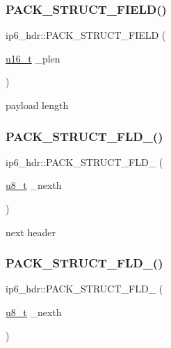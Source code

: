 \subsubsection{\texorpdfstring{P\+A\+C\+K\+\_\+\+S\+T\+R\+U\+C\+T\+\_\+\+F\+I\+E\+L\+D()}{PACK\_STRUCT\_FIELD()}\hspace{0.1cm}{\footnotesize\ttfamily [4/4]}}
{\footnotesize\ttfamily ip6\+\_\+hdr\+::\+P\+A\+C\+K\+\_\+\+S\+T\+R\+U\+C\+T\+\_\+\+F\+I\+E\+LD (\begin{DoxyParamCaption}\item[{\hyperlink{group__compiler__abstraction_ga77570ac4fcab86864fa1916e55676da2}{u16\+\_\+t}}]{\+\_\+plen }\end{DoxyParamCaption})}

payload length \mbox{\label{structip6__hdr_a7e8821e0eb16fe1f048228c119a69942}} 
\subsubsection{\texorpdfstring{P\+A\+C\+K\+\_\+\+S\+T\+R\+U\+C\+T\+\_\+\+F\+L\+D\+\_()}{PACK\_STRUCT\_FLD\_8()}\hspace{0.1cm}{\footnotesize\ttfamily [1/4]}}
{\footnotesize\ttfamily ip6\+\_\+hdr\+::\+P\+A\+C\+K\+\_\+\+S\+T\+R\+U\+C\+T\+\_\+\+F\+L\+D\+\_ (\begin{DoxyParamCaption}\item[{\hyperlink{group__compiler__abstraction_ga4caecabca98b43919dd11be1c0d4cd8e}{u8\+\_\+t}}]{\+\_\+nexth }\end{DoxyParamCaption})}

next header \mbox{\label{structip6__hdr_a7e8821e0eb16fe1f048228c119a69942}} 
\subsubsection{\texorpdfstring{P\+A\+C\+K\+\_\+\+S\+T\+R\+U\+C\+T\+\_\+\+F\+L\+D\+\_()}{PACK\_STRUCT\_FLD\_8()}\hspace{0.1cm}{\footnotesize\ttfamily [2/4]}}
{\footnotesize\ttfamily ip6\+\_\+hdr\+::\+P\+A\+C\+K\+\_\+\+S\+T\+R\+U\+C\+T\+\_\+\+F\+L\+D\+\_ (\begin{DoxyParamCaption}\item[{\hyperlink{group__compiler__abstraction_ga4caecabca98b43919dd11be1c0d4cd8e}{u8\+\_\+t}}]{\+\_\+nexth }\end{DoxyParamCaption})}

